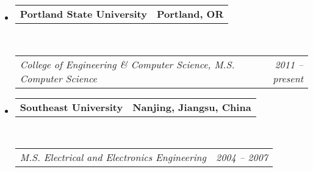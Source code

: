 \documentclass[10pt,letterpaper]{article}
\makeatletter
\newcommand{\headerrow}[2]
{\begin{tabular*}{\linewidth}{l@{\extracolsep{\fill}}r}
	#1 &
	#2 \\
\end{tabular*}}
\makeatother
\begin{document}
\begin{itemize}
	\parskip=0.1em

	\item 
	\headerrow
		{\textbf{Portland State University}}
		{\textbf{Portland, OR}}
	\\
	\headerrow
		{\emph{College of Engineering \& Computer Science, M.S. Computer Science}}
		{\emph{2011 -- present}}


	\item 
	\headerrow
		{\textbf{Southeast University}}
		{\textbf{Nanjing, Jiangsu, China}}
	\\
	\headerrow
		{\emph{M.S. Electrical and Electronics Engineering}}
		{\emph{2004 -- 2007}}


\end{itemize}
\end{document}
